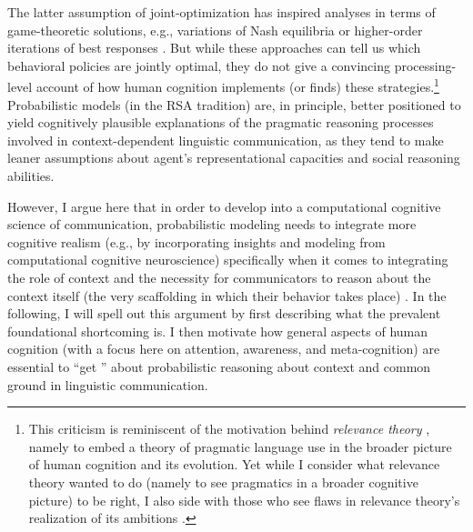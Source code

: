 \documentclass[fleqn,reqno,12pt]{article}
\newcommand{\real}{\acro{real}}
\begin{document}
The latter assumption of joint-optimization has inspired analyses in terms of game-theoretic solutions, e.g., variations of Nash equilibria \citep[e.g.,][]{Parikh1988:Language-and-st} or higher-order iterations of best responses \citep[e.g.][]{Pavan2013:Scalar-Implicat,Rothschild2011:Game-Theory-and,FrankeJager2014:Pragmatic-Back-}.
But while these approaches can tell us which behavioral policies are jointly optimal, they do not give a convincing processing-level account of how human cognition implements (or finds) these strategies.\footnote{
  This criticism is reminiscent of the motivation behind \emph{relevance theory} \citep{SperberWilson1995:Relevance:-Comm,WilsonSperber2004:Relevance-Theor}, namely to embed a theory of pragmatic language use in the broader picture of human cognition and its evolution.
  Yet while I consider what relevance theory wanted to do (namely to see pragmatics in a broader cognitive picture) to be right, I also side with those who see flaws in relevance theory’s realization of its ambitions \citep[e.g.,][]{GazdarGood1982:On-a-notion-of-,Levinson1989:A-Review-of-Rel}.
}
Probabilistic models (in the RSA tradition) are, in principle, better positioned to yield cognitively plausible explanations of the pragmatic reasoning processes involved in context-dependent linguistic communication, as they tend to make leaner assumptions about agent's representational capacities and social reasoning abilities.

However, I argue here that in order to develop into a computational cognitive science of communication, probabilistic modeling needs to integrate more cognitive realism (e.g., by incorporating insights and modeling from computational cognitive neuroscience) specifically when it comes to integrating the role of context and the necessity for communicators to reason about the context itself (the very scaffolding in which their behavior takes place)
\citep[for similar arguments see][]{Rubio-Fernandez2024:Cultural-evolut,Rubio-Fernandez2025:First-acquiring,Rubio-FernandezHarris2025:Common-Ground:-}.
In the following, I will spell out this argument by first describing what the prevalent foundational shortcoming is.
I then motivate how general aspects of human cognition (with a focus here on attention, awareness, and meta-cognition) are essential to ``get \real'' about probabilistic reasoning about context and common ground in linguistic communication.
\end{document}
